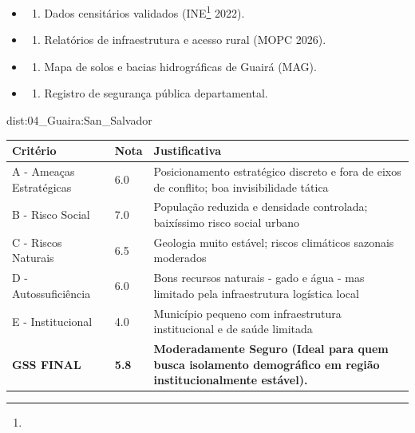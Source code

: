{\begin{itemize}
\tightlist
\item
  \begin{enumerate}
  \def\labelenumi{\arabic{enumi})}
  \tightlist
  \item
    Dados censitários validados (INE\footnote{\fineINE} 2022).
  \end{enumerate}
\item
  \begin{enumerate}
  \def\labelenumi{\arabic{enumi})}
  \setcounter{enumi}{1}
  \tightlist
  \item
    Relatórios de infraestrutura e acesso rural (MOPC 2026).
  \end{enumerate}
\item
  \begin{enumerate}
  \def\labelenumi{\arabic{enumi})}
  \setcounter{enumi}{2}
  \tightlist
  \item
    Mapa de solos e bacias hidrográficas de Guairá (MAG).
  \end{enumerate}
\item
  \begin{enumerate}
  \def\labelenumi{\arabic{enumi})}
  \setcounter{enumi}{3}
  \tightlist
  \item
    Registro de segurança pública departamental.
  \end{enumerate}
\end{itemize}}{dist:04_Guaira:San_Salvador}
\begin{table}[ht!]
\small \begin{tabular}{p{3.0cm}p{0.8cm}p{6.0cm}} \toprule
\textbf{Critério} & \textbf{Nota} & \textbf{Justificativa} \\ \midrule
A - Ameaças Estratégicas & 6.0 & Posicionamento estratégico discreto e fora de eixos de conflito; boa invisibilidade tática \\
B - Risco Social & 7.0 & População reduzida e densidade controlada; baixíssimo risco social urbano \\
C - Riscos Naturais & 6.5 & Geologia muito estável; riscos climáticos sazonais moderados \\
D - Autossuficiência & 6.0 & Bons recursos naturais - gado e água - mas limitado pela infraestrutura logística local \\
E - Institucional & 4.0 & Município pequeno com infraestrutura institucional e de saúde limitada \\
\midrule \textbf{GSS FINAL} & \textbf{5.8} & \textbf{Moderadamente Seguro (Ideal para quem busca isolamento demográfico em região institucionalmente estável).} \\ \bottomrule \end{tabular}
\end{table}
